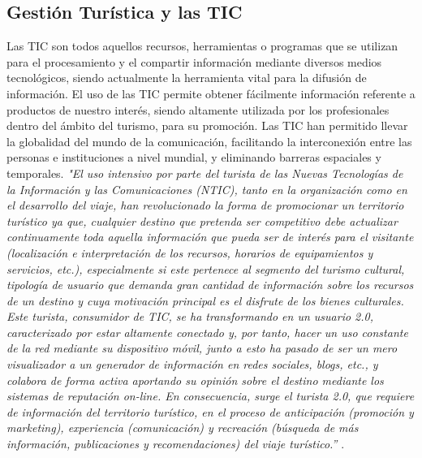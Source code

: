 \documentclass[12pt,letterpaper,openany]{book}
\begin{document}
\subsection{Gestión Turística y las TIC}
Las TIC son todos aquellos recursos, herramientas o programas que se utilizan para el procesamiento y el compartir información mediante diversos medios tecnológicos, siendo actualmente la herramienta vital para la difusión de información.
El uso de las TIC permite obtener fácilmente información referente a productos de nuestro interés, siendo altamente utilizada por los profesionales dentro del ámbito del turismo, para su promoción.
\vspace{5mm}\newline
Las TIC han permitido llevar la globalidad del mundo de la comunicación, facilitando la interconexión entre las personas e instituciones a nivel mundial, y eliminando barreras espaciales y temporales. 
\vspace{5mm}\newline
\textit{"El uso intensivo por parte del turista de las Nuevas Tecnologías de la Información y las Comunicaciones (NTIC), tanto en la organización como en el desarrollo del viaje, han revolucionado la forma de promocionar un territorio turístico ya que, cualquier destino que pretenda ser competitivo debe actualizar continuamente toda aquella información que pueda ser de interés para el visitante (localización e interpretación de los recursos, horarios de equipamientos y servicios, etc.), especialmente si este pertenece al segmento del turismo cultural, tipología de usuario que demanda gran cantidad de información sobre los recursos de un destino y cuya motivación principal es el disfrute de los bienes culturales.
Este turista, consumidor de TIC, se ha transformando en un usuario 2.0, caracterizado por estar altamente conectado y, por tanto, hacer un uso constante de la red mediante su dispositivo móvil, junto a esto ha pasado de ser un mero visualizador a un generador de información en redes sociales, blogs, etc., y colabora de forma activa aportando su opinión sobre el destino mediante los sistemas de reputación on-line. En consecuencia, surge el turista 2.0, que requiere de información del territorio turístico, en el proceso de anticipación (promoción y marketing), experiencia (comunicación) y recreación (búsqueda de más información, publicaciones y recomendaciones) del viaje turístico.”} \cite{9}.
\end{document}
